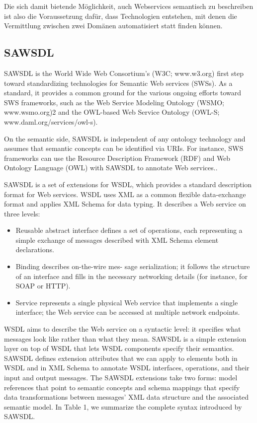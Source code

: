 Die sich damit bietende Möglichkeit, auch Webservices semantisch zu beschreiben ist also die Voraussetzung dafür, dass Technologien entstehen, mit denen die Vermittlung zwischen zwei Domänen automatisiert statt finden können.

\subsection{SAWSDL}

SAWSDL is the World Wide Web Consortium’s
(W3C; www.w3.org) first step toward standardizing
technologies for Semantic Web services
(SWSs). As a standard, it provides a common
ground for the various ongoing efforts
toward SWS frameworks, such as the
Web Service Modeling Ontology
(WSMO; www.wsmo.org)2 and the
OWL-based Web Service Ontology
(OWL-S; www.daml.org/services/owl-s).\cite[S.60]{ky-sawsdl}

On the semantic side, SAWSDL is independent
of any ontology technology
and assumes that semantic concepts
can be identified via URIs. For instance,
SWS frameworks can use the Resource
Description Framework (RDF) and Web
Ontology Language (OWL) with SAWSDL
to annotate Web services..\cite[S.61]{ky-sawsdl}

SAWSDL is a set of extensions for
WSDL, which provides a standard
description format for Web services.
WSDL uses XML as a common flexible
data-exchange format and applies
XML Schema for data typing. It
describes a Web service on three levels:
\begin{itemize}
\item Reusable abstract interface defines
a set of operations, each representing
a simple exchange of messages
described with XML Schema element
declarations.
\item  Binding describes on-the-wire mes-
sage serialization; it follows the
structure of an interface and fills in
the necessary networking details
(for instance, for SOAP or HTTP).
\item Service represents a single physical
Web service that implements a single
interface; the Web service can
be accessed at multiple network
endpoints.
\end{itemize}

WSDL aims to describe the Web
service on a syntactic level: it specifies
what messages look like rather
than what they mean. SAWSDL is a
simple extension layer on top of
WSDL that lets WSDL components
specify their semantics. SAWSDL
defines extension attributes that we
can apply to elements both in WSDL
and in XML Schema to annotate
WSDL interfaces, operations, and their
input and output messages.
The SAWSDL extensions take two
forms: model references that point to
semantic concepts and schema mappings
that specify data transformations
between messages’ XML data
structure and the associated semantic
model. In Table 1, we summarize
the complete syntax introduced by
SAWSDL.

